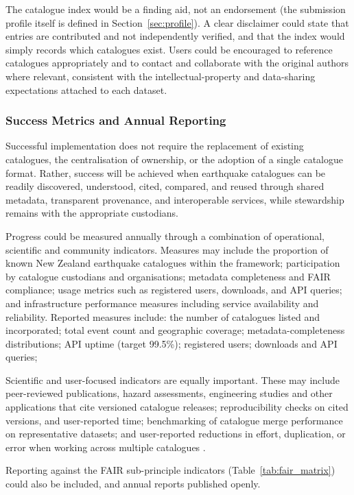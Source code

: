 \documentclass[11pt]{article}
\begin{document}
The catalogue index would be a finding aid, not an endorsement (the submission profile itself is defined in Section~\ref{sec:profile}). A clear disclaimer could state that entries are contributed and not independently verified, and that the index would simply records which catalogues exist. Users could be encouraged to reference catalogues appropriately and to contact and collaborate with the original authors where relevant, consistent with the intellectual-property and data-sharing expectations attached to each dataset.

\subsubsection{Success Metrics and Annual Reporting}
Successful implementation does not require the replacement of existing catalogues, the centralisation of ownership, or the adoption of a single catalogue format. Rather, success will be achieved when earthquake catalogues can be readily discovered, understood, cited, compared, and reused through shared metadata, transparent provenance, and interoperable services, while stewardship remains with the appropriate custodians.

Progress could be measured annually through a combination of operational, scientific and community indicators. Measures may include the proportion of known New Zealand earthquake catalogues within the framework; participation by catalogue custodians and organisations; metadata completeness and FAIR compliance; usage metrics such as registered users, downloads, and API queries; and infrastructure performance measures including service availability and reliability. Reported measures include: the number of catalogues listed and incorporated; total event count and geographic coverage; metadata-completeness distributions; API uptime (target 99.5\%); registered users; downloads and API queries; 

Scientific and user-focused indicators are equally important. These may include peer-reviewed publications, hazard assessments, engineering studies and other applications that cite versioned catalogue releases; reproducibility checks on cited versions, and user-reported time; benchmarking of catalogue merge performance on representative datasets; and user-reported reductions in effort, duplication, or error when working across multiple catalogues . 

Reporting against the FAIR sub-principle indicators (Table~\ref{tab:fair_matrix}) could also be included, and annual reports published openly. 
\end{document}
